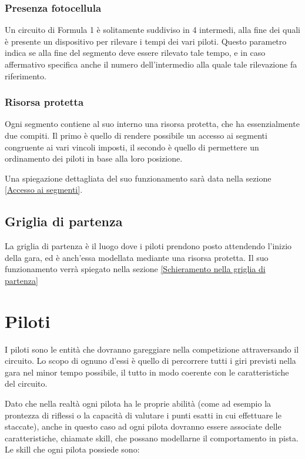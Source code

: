 \documentclass[a4paper,11pt, twoside, openright]{book}
\begin{document}
	\subsubsection{Presenza fotocellula}
	  Un circuito di Formula 1 è solitamente suddiviso in 4 intermedi, alla fine dei quali
	  è presente un dispositivo per rilevare i tempi dei vari piloti. Questo parametro
	  indica se alla fine del segmento deve essere rilevato tale tempo, e in caso affermativo
	  specifica anche il numero dell'intermedio alla quale tale rilevazione fa riferimento.
	
	\subsubsection{Risorsa protetta}
	  Ogni segmento contiene al suo interno una risorsa protetta, che ha essenzialmente due compiti. Il primo
	  è quello di rendere possibile un accesso ai segmenti congruente ai vari vincoli imposti, 
	  il secondo è quello di permettere un ordinamento dei piloti in base alla loro posizione.
	  
	  Una spiegazione dettagliata del suo funzionamento sarà data nella sezione \ref{Accesso ai segmenti}.
	  
      \subsection{Griglia di partenza}
	La griglia di partenza è il luogo dove i piloti prendono posto attendendo l'inizio della gara, ed è anch'essa modellata
	mediante una risorsa protetta.
	Il suo funzionamento verrà spiegato nella sezione \ref{Schieramento nella griglia di partenza}
	  
    \section{Piloti}
      I piloti sono le entità che dovranno gareggiare nella competizione attraversando il circuito.
      Lo scopo di ognuno d'essi è quello di percorrere tutti i giri previsti nella gara nel minor tempo possibile,
      il tutto in modo coerente con le caratteristiche del circuito.
      
      Dato che nella realtà ogni pilota ha le proprie abilità (come ad esempio la prontezza di riflessi
      o la capacità di valutare i punti esatti in cui effettuare le staccate),
      anche in questo caso ad ogni pilota dovranno essere associate delle caratteristiche, chiamate skill, che possano
      modellarne il comportamento in pista. Le skill che ogni pilota possiede sono:
      
\end{document}
